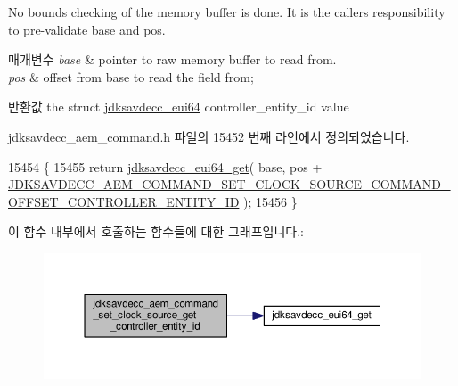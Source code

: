 No bounds checking of the memory buffer is done. It is the caller\textquotesingle{}s responsibility to pre-\/validate base and pos.


\begin{DoxyParams}{매개변수}
{\em base} & pointer to raw memory buffer to read from. \\
\hline
{\em pos} & offset from base to read the field from; \\
\hline
\end{DoxyParams}
\begin{DoxyReturn}{반환값}
the struct \hyperlink{structjdksavdecc__eui64}{jdksavdecc\+\_\+eui64} controller\+\_\+entity\+\_\+id value 
\end{DoxyReturn}


jdksavdecc\+\_\+aem\+\_\+command.\+h 파일의 15452 번째 라인에서 정의되었습니다.


\begin{DoxyCode}
15454 \{
15455     \textcolor{keywordflow}{return} \hyperlink{group__eui64_ga2652311a25a6b91cddbed75c108c7031}{jdksavdecc\_eui64\_get}( base, pos + 
      \hyperlink{group__command__set__clock__source_ga6f6252d6d338605272ef77c8d533d675}{JDKSAVDECC\_AEM\_COMMAND\_SET\_CLOCK\_SOURCE\_COMMAND\_OFFSET\_CONTROLLER\_ENTITY\_ID}
       );
15456 \}
\end{DoxyCode}


이 함수 내부에서 호출하는 함수들에 대한 그래프입니다.\+:
\nopagebreak
\begin{figure}[H]
\begin{center}
\leavevmode
\includegraphics[width=350pt]{group__command__set__clock__source_gaf660fe37452090247a8a9692811a5925_cgraph}
\end{center}
\end{figure}


